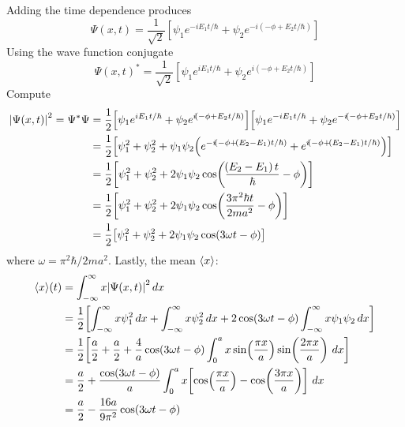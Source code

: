 \documentclass[a4paper]{article}
\begin{document}
Adding the time dependence produces
\[
	\Psi \!\left( x,t \right) = \frac{1}{\sqrt{2}} \!\left[ \psi_{1}e^{-iE_{1}t / \hbar} + \psi_{2}e^{-i \!\left( -\phi + E_{2}t / \hbar \right)} \right]
\]
Using the wave function conjugate
\[
	\Psi \!\left( x,t \right)^{*} = \frac{1}{\sqrt{2}} \!\left[ \psi_{1}e^{iE_{1}t / \hbar} + \psi_{2}e^{i \!\left( -\phi + E_{2}t / \hbar \right)} \right]
\]
Compute
\begin{align*}
	\abs{\Psi \!\left( x,t \right)}^{2} = \Psi^{*}\Psi & = \frac{1}{2}\!\left[ \psi_{1}e^{iE_{1}t / \hbar} + \psi_{2}e^{i \!\left( -\phi + E_{2}t / \hbar \right)} \right]\!\left[ \psi_{1}e^{-iE_{1}t / \hbar} + \psi_{2}e^{-i \!\left( -\phi + E_{2}t / \hbar \right)} \right] \\
	 & = \frac{1}{2}\!\left[ \psi^{2}_{1} + \psi^{2}_{2} + \psi_{1}\psi_{2}\!\left( e^{-i \!\left( -\phi + \!\left( E_{2} - E_{1} \right)t / \hbar \right)} + e^{i \!\left( -\phi + \!\left( E_{2} - E_{1} \right)t / \hbar \right)} \right) \right] \\
	 & = \frac{1}{2}\!\left[ \psi^{2}_{1} + \psi^{2}_{2} + 2\psi_{1}\psi_{2}\cos\!\left(\frac{\!\left( E_{2} - E_{1} \right)t}{\hbar} - \phi\right) \right] \\
	 & = \frac{1}{2}\!\left[ \psi^{2}_{1} + \psi^{2}_{2} + 2\psi_{1}\psi_{2}\cos\!\left(\frac{3 \pi^{2}\hbar t}{2ma^{2}} - \phi\right) \right] \\
	 & = \frac{1}{2}\!\left[ \psi^{2}_{1} + \psi^{2}_{2} + 2\psi_{1}\psi_{2}\cos\!\left(3 \omega t - \phi\right) \right]
\end{align*}
where \( \omega = \pi^{2}\hbar / 2ma^{2} \). Lastly, the mean \( \braket{x} \):
\begin{align*}
	\braket{x}\!\left( t \right) & = \int^{\infty}_{-\infty} x \abs{\Psi \!\left( x,t \right)}^{2} \, dx \\
		   & = \frac{1}{2}\!\left[ \int^{\infty}_{-\infty} x\psi^{2}_{1} \, dx + \int^{\infty}_{-\infty} x\psi^{2}_{2} \, dx + 2 \cos\!\left(3 \omega t - \phi\right)\int^{\infty}_{-\infty} x\psi_{1}\psi_{2} \, dx \right] \\ 
		   & = \frac{1}{2}\!\left[ \frac{a}{2} + \frac{a}{2} + \frac{4}{a} \cos\!\left(3 \omega t - \phi\right)\int^{a}_{0} x \sin\!\left(\frac{\pi x}{a}\right)\sin\!\left(\frac{2 \pi x}{a}\right) \, dx \right] \\
		   & = \frac{a}{2} + \frac{\cos\!\left(3 \omega t - \phi\right)}{a}\int^{a}_{0} x \!\left[ \cos\!\left(\frac{\pi x}{a}\right) - \cos\!\left(\frac{3 \pi x}{a}\right) \right] \, dx \\
		   & = \frac{a}{2} - \frac{16a}{9 \pi^{2}}\cos\!\left(3 \omega t - \phi\right)
\end{align*}
\end{document}
